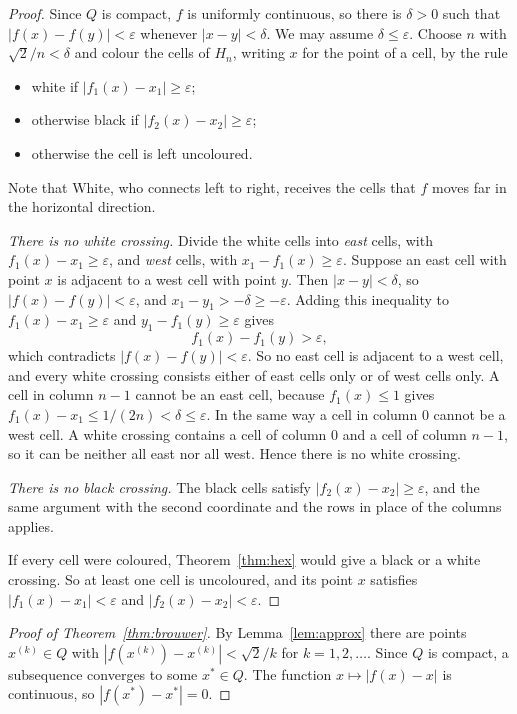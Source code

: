 \documentclass[11pt,a4paper]{amsart}
\theoremstyle{definition}
\theoremstyle{remark}
\newcommand{\Q}{Q}
\newcommand{\eps}{\varepsilon}
\begin{document}
\begin{proof}
Since $\Q$ is compact, $f$ is uniformly continuous, so there is $\delta > 0$ such that $|f(x) - f(y)| < \eps$ whenever $|x - y| < \delta$. We may assume $\delta \le \eps$. Choose $n$ with $\sqrt{2}/n < \delta$ and colour the cells of $H_n$, writing $x$ for the point of a cell, by the rule
\begin{itemize}
  \item white if $|f_1(x) - x_1| \ge \eps$;
  \item otherwise black if $|f_2(x) - x_2| \ge \eps$;
  \item otherwise the cell is left uncoloured.
\end{itemize}
Note that White, who connects left to right, receives the cells that $f$ moves far in the horizontal direction.

\emph{There is no white crossing.} Divide the white cells into \emph{east} cells, with $f_1(x) - x_1 \ge \eps$, and \emph{west} cells, with $x_1 - f_1(x) \ge \eps$. Suppose an east cell with point $x$ is adjacent to a west cell with point $y$. Then $|x - y| < \delta$, so $|f(x) - f(y)| < \eps$, and $x_1 - y_1 > -\delta \ge -\eps$. Adding this inequality to $f_1(x) - x_1 \ge \eps$ and $y_1 - f_1(y) \ge \eps$ gives
\[
  f_1(x) - f_1(y) > \eps ,
\]
which contradicts $|f(x) - f(y)| < \eps$. So no east cell is adjacent to a west cell, and every white crossing consists either of east cells only or of west cells only. A cell in column $n-1$ cannot be an east cell, because $f_1(x) \le 1$ gives $f_1(x) - x_1 \le 1/(2n) < \delta \le \eps$. In the same way a cell in column $0$ cannot be a west cell. A white crossing contains a cell of column $0$ and a cell of column $n-1$, so it can be neither all east nor all west. Hence there is no white crossing.

\emph{There is no black crossing.} The black cells satisfy $|f_2(x) - x_2| \ge \eps$, and the same argument with the second coordinate and the rows in place of the columns applies.

If every cell were coloured, Theorem~\ref{thm:hex} would give a black or a white crossing. So at least one cell is uncoloured, and its point $x$ satisfies $|f_1(x) - x_1| < \eps$ and $|f_2(x) - x_2| < \eps$.
\end{proof}

\begin{proof}[Proof of Theorem~\ref{thm:brouwer}]
By Lemma~\ref{lem:approx} there are points $x^{(k)} \in \Q$ with $|f(x^{(k)}) - x^{(k)}| < \sqrt{2}/k$ for $k = 1, 2, \dots$. Since $\Q$ is compact, a subsequence converges to some $x^* \in \Q$. The function $x \mapsto |f(x) - x|$ is continuous, so $|f(x^*) - x^*| = 0$.
\end{proof}
\end{document}
